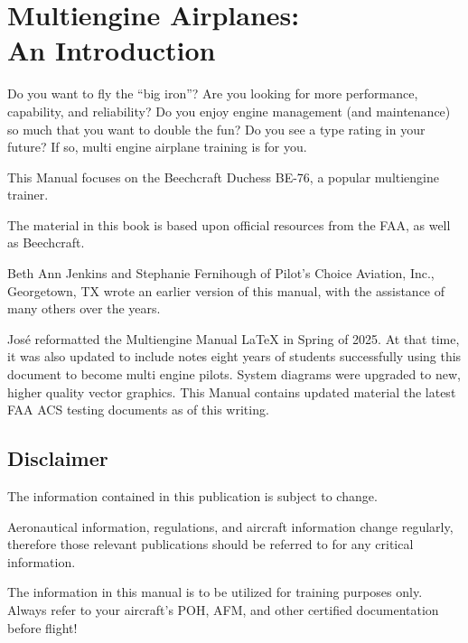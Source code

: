 
\chapter*{Multiengine Airplanes:\\An Introduction}


Do you want to fly the ``big iron''? Are you looking for more performance, capability,
and reliability? Do you enjoy engine management (and maintenance) so much that you want to
double the fun? Do you see a type rating in your future? If so, multi engine airplane training is for you.


This Manual focuses on the Beechcraft Duchess BE-76, a popular multiengine trainer.

The material in this book is based upon official resources from the FAA, as well as Beechcraft.

Beth Ann Jenkins and Stephanie Fernihough of Pilot's Choice Aviation, Inc., Georgetown, TX
wrote an earlier version of this manual, with the assistance of many others over the years.

Jos\'e reformatted the Multiengine Manual \LaTeX{} in Spring of 2025. At that time, it was also
updated to include notes eight years of students successfully using this document to become multi
engine pilots. System diagrams were upgraded to new, higher quality vector graphics. This Manual
contains updated material the latest FAA ACS testing documents as of this writing.
%

\section*{Disclaimer}

The information contained in this publication is subject to change.

Aeronautical information, regulations, and aircraft information change regularly, therefore those relevant
publications should be referred to for any critical information.

The information in this manual is to be utilized for training purposes only. Always
refer to your aircraft's POH, AFM, and other certified documentation before flight!
